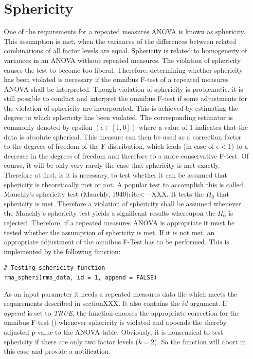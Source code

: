 \documentclass[11pt]{article}
\begin{document}
	\section{Sphericity}
		One of the requirements for a repeated measures ANOVA is known as sphericity. This assumption is met, when the variances of the differences between related combinations of all factor levels are equal. Sphericity is related to homogeneity of variances in an ANOVA without repeated measures. The violation of sphericity causes the test to become too liberal. Therefore, determining whether sphericity has been violated is necessary if the omnibus F-test of a repeated measures ANOVA shall be interpreted. Though violation of sphericity is problematic, it is still possible to conduct and interpret the omnibus F-test if some adjustments for the violation of sphericity are incorporated. This is achieved by estimating the degree to which sphericity has been violated. The corresponding estimator is commonly denoted by epsilon $(\epsilon \in[1,0])$ where a value of 1 indicates that the data is absolute spherical. This measure can then be used as a correction factor to the degrees of freedom of the F-distribution, which leads (in case of $\epsilon<1$) to a decrease in the degrees of freedom and therefore to a more conservative F-test. Of course, it will be only very rarely the case that sphericity is met exactly. Therefore at first, is it is necessary, to test whether it can be assumed that sphericity is theoretically met or not. A popular test to accomplish this is called Mauchly's sphericity test (Mauchly, 1940)cite<---XXX. It tests the $H_0$ that sphericity is met. Therefore a violation of sphericity shall be assumed whenever the Mauchly's sphericity test yields a significant results whereupon the $H_0$ is rejected. Therefore, if a repeated measures ANOVA is appropriate it must be tested whether the assumption of sphericity is met. If it is not met, an appropriate adjustment of the omnibus F-Test has to be performed. This is implemented by the following function:\\
		
		\begin{lstlisting}
# Testing sphericity function
rma_spheri(rma_data, id = 1, append = FALSE)
		\end{lstlisting}
		
		As an input parameter it needs a repeated measures data file which meets the requirements described in sectionXXX. It also contains the $id$ argument. If $append$ is set to \textit{TRUE}, the function chooses the appropriate correction  for the omnibus F-test (\citealp{girden1992anova}) whenever sphericity is violated and appends the thereby adjusted p-value to the ANOVA-table. Obviously, it is nonsensical to test sphericity if there are only two factor levels ($k = 2$). So the function will abort in this case and provide a notification.\\
		
\end{document}
